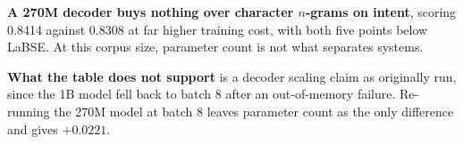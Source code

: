 \textbf{A 270M decoder buys nothing over character $n$-grams on intent},
scoring 0.8414 against 0.8308 at far higher training cost, with both five points
below LaBSE. At this corpus size, parameter count is not what separates systems.

\textbf{What the table does not support} is a decoder scaling claim as
originally run, since the 1B model fell back to batch 8 after an out-of-memory
failure. Re-running the 270M model at batch 8 leaves parameter count as the only
difference and gives $+0.0221$.
